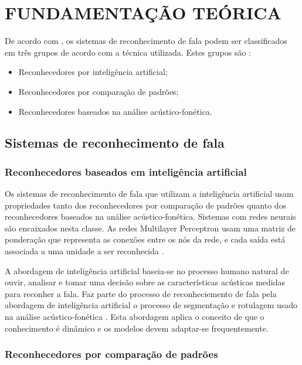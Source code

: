 \chapter{FUNDAMENTAÇÃO TEÓRICA}
\label{chap:referencial_teorico}
\thispagestyle{plain}
De acordo com \cite{fundRecFala}, os  sistemas de reconhecimento de fala podem ser classificados em três grupos de acordo com a técnica utilizada. Estes grupos são :
\begin{itemize}
\item Reconhecedores por inteligência artificial;
\item Reconhecedores por comparação de padrões;
\item Reconhecedores baseados na análise acústico-fonética.
\end{itemize}
\section{Sistemas de reconhecimento de fala }

\label{sec:sistemasdereconhecimentodefala}


\subsection{Reconhecedores baseados em inteligência artificial}

Os sistemas de reconhecimento de fala que utilizam a inteligência artificial usam propriedades tanto dos reconhecedores por comparação de padrões quanto dos reconhecedores baseados na análise acústico-fonética. Sistemas com redes neurais são encaixados nesta classe. As redes Multilayer Perceptron usam uma matriz de ponderação que representa as conexões entre os nós da rede, e cada saída está associada a uma unidade a ser reconhecida \cite{kluwerNeural}.

A abordagem de inteligência artificial  baseia-se no processo humano natural de ouvir, analisar e tomar uma decisão sobre as características acústicas medidas para reconher a fala. Faz parte do processo de reconheciemento de fala pela abordagem de inteligência artificial o processo de segmentação e rotulagem usado na análise acústico-fonética  \cite{fundRecFala}. Esta abordagem aplica o conceito de que o conhecimento é dinâmico  e os modelos devem adaptar-se frequentemente. 

\subsection{Reconhecedores por comparação de padrões}

